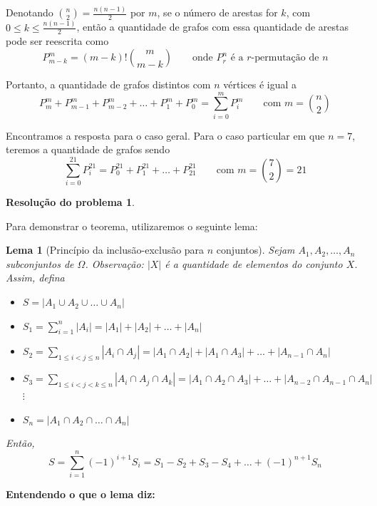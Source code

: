 \documentclass[12pt, a4paper]{article}
\theoremstyle{definition} \newtheorem{prob}{Problema}
\newtheorem{res}{Resolução do problema}
\theoremstyle{plain} \newtheorem*{teo}{Teorema}
\newtheorem*{lem}{Lema}
\begin{document}
Denotando \(\binom{n}{2}=\frac{n(n-1)}{2}\) por \(m\), se o número de arestas for \(k\), com \(0 \leq k \leq \frac{n(n-1)}{2}\), então a quantidade de grafos com essa quantidade de arestas pode ser reescrita como \[P^{m}_{m-k} = (m-k)!\binom{m}{m-k} \qquad \text{onde } P^n_r \text{ é a } r\text{-permutação de }n\]

Portanto, a quantidade de grafos distintos com \(n\) vértices é igual a \[P^m_m + P^m_{m-1} + P^m_{m-2} + \ldots +P^m_{1} + P^m_0 = \sum \limits^{m}_{i = 0} P^m_i \qquad \text{com }m = \binom{n}{2}
\]

Encontramos a resposta para o caso geral. Para o caso particular em que \(n = 7\), teremos a quantidade de grafos sendo \[ \sum \limits^{21}_{i = 0} P^{21}_i = P^{21}_0 + P^{21}_1 + \ldots + P^{21}_{21} \qquad \text{com } m =  \binom{7}{2} = 21\]

\begin{res} %
\end{res}

Para demonstrar o teorema, utilizaremos o seguinte lema: 
\begin{lem}[Princípio da inclusão-exclusão para \(n\) conjuntos]
Sejam \(A_1, A_2, \ldots, A_n\) subconjuntos de \(\Omega\). Observação: \(|X|\) é a quantidade de elementos do conjunto \(X\). Assim, defina \begin{itemize}
\item \(S = |A_1 \cup A_2 \cup \ldots \cup A_n|\) 

\item \(S_1 = \sum \limits_{i = 1}^{n} |A_i|=|A_1| + |A_2| + \ldots + |A_n|\) 

\item \(S_2 = \sum \limits_{1 \leq i < j \leq n} |A_i \cap A_j|= |A_1 \cap A_2| + |A_1 \cap A_3| + \ldots +|A_{n-1} \cap A_n|\) 

\item \(S_3 = \sum \limits_{1 \leq i < j < k \leq n} |A_i \cap A_j \cap A_k| = |A_1 \cap A_2 \cap A_3| +  \ldots + |A_{n-2} \cap A_{n-1} \cap A_n|\) \\

\(\vdots\)
\item \(S_n = |A_1 \cap A_2 \cap  \ldots \cap A_n|\)

\end{itemize}
Então, \[S = \sum \limits_{i = 1}^{n} (-1)^{i+1}S_i= S_1 - S_2 + S_3 - S_4 + \ldots + (-1)^{n+1}S_n\] 
\end{lem}

\textbf{Entendendo o que o lema diz:}\\
\end{document}
